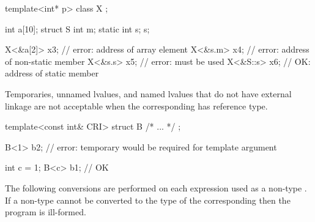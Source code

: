 \begin{codeblock}
template<int* p> class X { };

int a[10];
struct S { int m; static int s; } s;

X<&a[2]> x3;                    // error: address of array element
X<&s.m> x4;                     // error: address of non-static member
X<&s.s> x5;                     // error:  must be used
X<&S::s> x6;                    // OK: address of static member
\end{codeblock}
\exitexampleb
\exitnoteb

\pnum
\enternote
Temporaries, unnamed lvalues, and named lvalues that do not have external
linkage are not acceptable
when the corresponding
has reference type.
\enterexample

\begin{codeblock}
template<const int& CRI> struct B { /* ... */ };

B<1> b2;                        // error: temporary would be required for template argument

int c = 1;
B<c> b1;                        // OK
\end{codeblock}
\exitexampleb
\exitnoteb

\pnum
The following conversions are performed on each expression used as a non-type
.
If a non-type
cannot be converted to the type of the corresponding
then the program is ill-formed.

